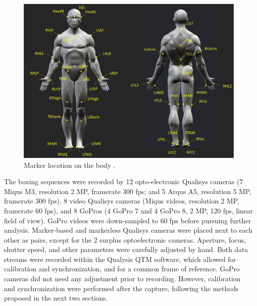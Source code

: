 \begin{figure}[!ht]
	\centering
	\def\svgwidth{1\columnwidth} 
	\fontsize{10pt}{10pt}\selectfont
	\includegraphics[width=\linewidth]{"../Chap6/Figures/Fig_MkBoxe.PNG"}
	\caption{Marker location on the body \cite{Lahkar2022b}.}
	\label{fig_mkboxe}
\end{figure}

The boxing sequences were recorded by 12 opto-electronic Qualisys cameras (7 Miqus M3, resolution 2 MP, framerate 300 fps; and 5 Arqus A5, resolution 5 MP, framerate 300 fps), 8 video Qualisys cameras (Miqus videos, resolution 2 MP, framerate 60 fps), and 8 GoPros (4 GoPro 7 and 4 GoPro 8, 2 MP, 120 fps, linear field of view). GoPro videos were down-sampled to 60 fps before pursuing further analysis. Marker-based and markerless Qualisys cameras were placed next to each other as pairs, except for the 2 surplus optoelectronic cameras. Aperture, focus, shutter speed, and other parameters were carefully adjusted by hand. Both data streams were recorded within the Qualysis QTM software, which allowed for calibration and synchronization, and for a common frame of reference. GoPro cameras did not need any adjustment prior to recording. However, calibration and synchronization were performed after the capture, following the methods proposed in the next two sections. 

